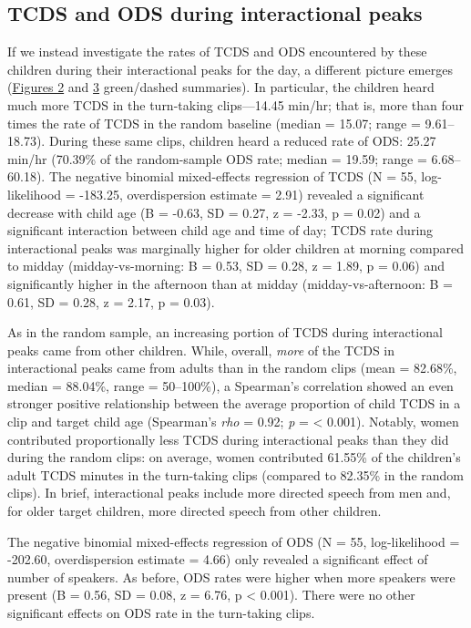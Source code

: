 \documentclass[,man,floatsintext]{apa6}
\begin{document}
\subsection{TCDS and ODS during interactional
peaks}\label{tcds-and-ods-during-interactional-peaks}

If we instead investigate the rates of TCDS and ODS encountered by these
children during their interactional peaks for the day, a different
picture emerges (\protect\hyperlink{fig2}{Figures 2} and
\protect\hyperlink{fig3}{3} green/dashed summaries). In particular, the
children heard much more TCDS in the turn-taking clips---14.45 min/hr;
that is, more than four times the rate of TCDS in the random baseline
(median = 15.07; range = 9.61--18.73). During these same clips, children
heard a reduced rate of ODS: 25.27 min/hr (70.39\% of the random-sample
ODS rate; median = 19.59; range = 6.68--60.18). The negative binomial
mixed-effects regression of TCDS (N = 55, log-likelihood = -183.25,
overdispersion estimate = 2.91) revealed a significant decrease with
child age (B = -0.63, SD = 0.27, z = -2.33, p = 0.02) and a significant
interaction between child age and time of day; TCDS rate during
interactional peaks was marginally higher for older children at morning
compared to midday (midday-vs-morning: B = 0.53, SD = 0.28, z = 1.89, p
= 0.06) and significantly higher in the afternoon than at midday
(midday-vs-afternoon: B = 0.61, SD = 0.28, z = 2.17, p = 0.03).

As in the random sample, an increasing portion of TCDS during
interactional peaks came from other children. While, overall,
\emph{more} of the TCDS in interactional peaks came from adults than in
the random clips (mean = 82.68\%, median = 88.04\%, range = 50--100\%),
a Spearman's correlation showed an even stronger positive relationship
between the average proportion of child TCDS in a clip and target child
age (Spearman's \emph{rho} = 0.92; \emph{p} = \textless{} 0.001).
Notably, women contributed proportionally less TCDS during interactional
peaks than they did during the random clips: on average, women
contributed 61.55\% of the children's adult TCDS minutes in the
turn-taking clips (compared to 82.35\% in the random clips). In brief,
interactional peaks include more directed speech from men and, for older
target children, more directed speech from other children.

The negative binomial mixed-effects regression of ODS (N = 55,
log-likelihood = -202.60, overdispersion estimate = 4.66) only revealed
a significant effect of number of speakers. As before, ODS rates were
higher when more speakers were present (B = 0.56, SD = 0.08, z = 6.76, p
\textless{} 0.001). There were no other significant effects on ODS rate
in the turn-taking clips.
\end{document}
